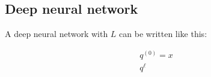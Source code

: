 \subsection*{Deep neural network}
A deep neural network with $L$ can be written like this: 

	\begin{equation}
	\begin{aligned}
		q^{(0)} = x \\
		q^{\ell}
	\end{aligned}
	\end{equation}







